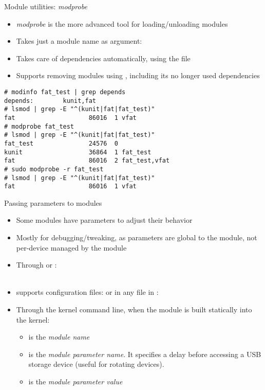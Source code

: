 \begin{frame}[fragile]{Module utilities: {\em modprobe}}
  \begin{itemize}
  \item {\em modprobe} is the more advanced tool for loading/unloading
    modules
  \item Takes just a module name as argument: 
  \item Takes care of dependencies automatically, using the
     file
  \item Supports removing modules using , including
    its no longer used dependencies
  \end{itemize}

  \begin{block}{}
    {\tiny
\begin{verbatim}
# modinfo fat_test | grep depends
depends:        kunit,fat
# lsmod | grep -E "^(kunit|fat|fat_test)"
fat                    86016  1 vfat
# modprobe fat_test
# lsmod | grep -E "^(kunit|fat|fat_test)"
fat_test               24576  0
kunit                  36864  1 fat_test
fat                    86016  2 fat_test,vfat
# sudo modprobe -r fat_test
# lsmod | grep -E "^(kunit|fat|fat_test)"
fat                    86016  1 vfat
\end{verbatim}
    }
  \end{block}
\end{frame}

\begin{frame}{Passing parameters to modules}
  \small
  \begin{itemize}
  \item Some modules have parameters to adjust their behavior
  \item Mostly for debugging/tweaking, as parameters are global to the
    module, not per-device managed by the module
  \item Through  or :\\
    \\
  \item {} supports configuration files:  or in any file in :\\
  \item Through the kernel command line, when the module is built statically into the kernel:\\
    \begin{itemize}
    \item {} is the {\em module name}
    \item {} is the {\em module parameter name}. It
      specifies a delay before accessing a USB storage device (useful for
      rotating devices).
    \item {} is the {\em module parameter value}
    \end{itemize}
  \end{itemize}
\end{frame}

